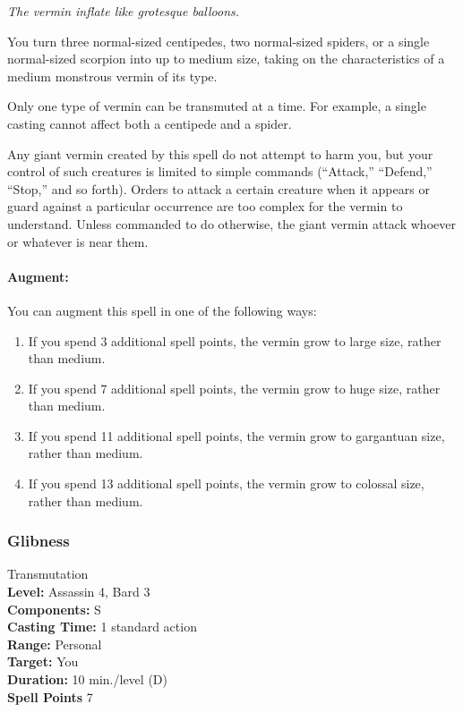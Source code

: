 \emph{The vermin inflate like grotesque balloons.}

You turn three normal-sized centipedes, two normal-sized spiders, or a single normal-sized scorpion into up to medium size, taking on the characteristics of a medium monstrous vermin of its type. 

Only one type of vermin can be transmuted at a time. For example, a single casting cannot affect both a centipede and a spider.

Any giant vermin created by this spell do not attempt to harm you, but your control of such creatures is limited to simple commands (``Attack,'' ``Defend,'' ``Stop,'' and so forth). 
Orders to attack a certain creature when it appears or guard against a particular occurrence are too complex for the vermin to understand. 
Unless commanded to do otherwise, the giant vermin attack whoever or whatever is near them.

\paragraph{Augment:} You can augment this spell in one of the following ways:
\begin{enumerate}
 \item If you spend 3 additional spell points, the vermin grow to large size, rather than medium.
 \item If you spend 7 additional spell points, the vermin grow to huge size, rather than medium.
 \item If you spend 11 additional spell points, the vermin grow to gargantuan size, rather than medium.
 \item If you spend 13 additional spell points, the vermin grow to colossal size, rather than medium.
\end{enumerate}

\subsubsection{Glibness}
\label{Spell:Glibness}
Transmutation
\\ \textbf{Level:} Assassin 4, Bard 3
\\ \textbf{Components:} S
\\ \textbf{Casting Time:} 1 standard action
\\ \textbf{Range:} Personal
\\ \textbf{Target:} You
\\ \textbf{Duration:} 10 min./level (D)
\\ \textbf{Spell Points} 7


